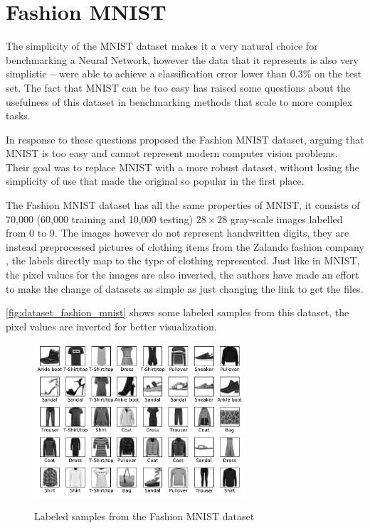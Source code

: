 \section{Fashion MNIST} \label{sec:fashion_mnist}
The simplicity of the \gls{MNIST} dataset makes it a very natural choice for benchmarking a Neural Network, however the data that it represents is also very simplistic \textbf{--} \textcite{mnistSOTA2013} were able to achieve a classification error lower than 0.3\% on the test set. The fact that \gls{MNIST} can be too easy has raised some questions about the usefulness of this dataset in benchmarking methods that scale to more complex tasks.

In response to these questions \textcite{fashionMNIST2017} proposed the Fashion MNIST dataset, arguing that \gls{MNIST} is too easy and cannot represent modern computer vision problems. Their goal was to replace \gls{MNIST} with a more robust dataset, without losing the simplicity of use that made the original so popular in the first place.

The Fashion MNIST dataset has all the same properties of \gls{MNIST}, it consists of 70,000 (60,000 training and 10,000 testing) $28{\times}28$ gray-scale images labelled from 0 to 9. The images however do not represent handwritten digits, they are instead preprocessed pictures of clothing items from the Zalando fashion company \cite{fashionMNIST2017}, the labels directly map to the type of clothing represented. Just like in \gls{MNIST}, the pixel values for the images are also inverted, the authors have made an effort to make the change of datasets as simple as just changing the link to get the files.

\autoref{fig:dataset_fashion_mnist} shows some labeled samples from this dataset, the pixel values are inverted for better visualization.
\begin{figure}[hbt]
    \centering
    \caption{Labeled samples from the Fashion MNIST dataset}
    \includegraphics[width=0.7\textwidth]{chapters/Datasets/figures/Fashion_MNIST.pdf}
    \label{fig:dataset_fashion_mnist}
\end{figure}


